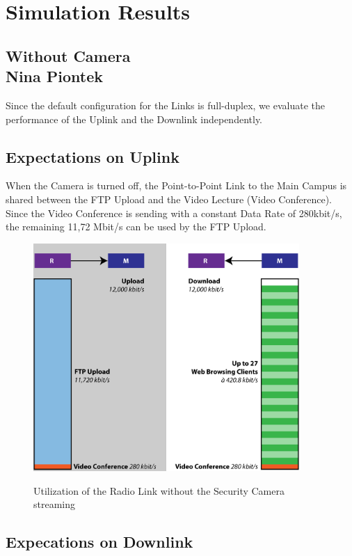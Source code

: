 \documentclass[a4paper,10pt]{book}\usepackage{graphicx}
\begin{document}
\chapter{Simulation Results}
\section{Without Camera\\ {\large Nina Piontek}}

Since the default configuration for the Links is full-duplex, we evaluate the performance of the Uplink and the Downlink independently.
\section{Expectations on Uplink}
When the Camera is turned off, the Point-to-Point Link to the Main Campus is shared between the FTP Upload and the Video Lecture (Video Conference).
Since the Video Conference is sending with a constant Data Rate of 280kbit/s, the remaining 
11,72 Mbit/s can be used by the FTP Upload.
\begin{figure}[!ht]
  \centering
    \includegraphics[width=0.9\textwidth]{graphics-02.png}
    \label{fig:g2}
    \caption{Utilization of the Radio Link without the Security Camera streaming}
\end{figure}

\section{Expecations on Downlink}
\end{document}
